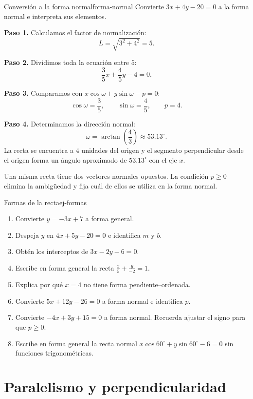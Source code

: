 \begin{example}{Conversión a la forma normal}{forma-normal}
Convierte $3x+4y-20=0$ a la forma normal e interpreta sus elementos.
\begin{solution}
\textbf{Paso 1.} Calculamos el factor de normalización:
\[
L=\sqrt{3^2+4^2}=5.
\]

\textbf{Paso 2.} Dividimos toda la ecuación entre $5$:
\[
\frac35x+\frac45y-4=0.
\]

\textbf{Paso 3.} Comparamos con
$x\cos\omega+y\sin\omega-p=0$:
\[
\cos\omega=\frac35,
\qquad
\sin\omega=\frac45,
\qquad
p=4.
\]

\textbf{Paso 4.} Determinamos la dirección normal:
\[
\omega=\arctan\left(\frac{4}{3}\right)\approx53.13^\circ.
\]
La recta se encuentra a $4$ unidades del origen y el segmento perpendicular
desde el origen forma un ángulo aproximado de $53.13^\circ$ con el eje $x$.
\end{solution}
\end{example}

\begin{remark}
Una misma recta tiene dos vectores normales opuestos. La condición $p\geq0$
elimina la ambigüedad y fija cuál de ellos se utiliza en la forma normal.
\end{remark}

\begin{exercise}{Formas de la recta}{ej-formas}
\begin{enumerate}[label=\alph*)]
  \item Convierte $y=-3x+7$ a forma general.
  \item Despeja $y$ en $4x+5y-20=0$ e identifica $m$ y $b$.
  \item Obtén los interceptos de $3x-2y-6=0$.
  \item Escribe en forma general la recta $\frac{x}{5}+\frac{y}{-2}=1$.
  \item Explica por qué $x=4$ no tiene forma pendiente--ordenada.
  \item Convierte $5x+12y-26=0$ a forma normal e identifica $p$.
  \item Convierte $-4x+3y+15=0$ a forma normal. Recuerda ajustar el signo
  para que $p\geq0$.
  \item Escribe en forma general la recta normal
  $x\cos60^\circ+y\sin60^\circ-6=0$ sin funciones trigonométricas.
\end{enumerate}
\end{exercise}

\section{Paralelismo y perpendicularidad}

